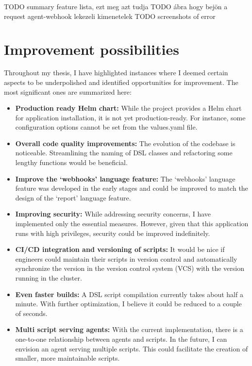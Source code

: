 TODO summary feature lista, ezt meg azt tudja
TODO ábra hogy bejön a request agent-webhook lekezeli kimenetelek
TODO screenshots of error

\section{Improvement possibilities}

Throughout my thesis, I have highlighted instances where I deemed certain aspects to be underpolished and identified opportunities for improvement. The most significant ones are summarized here:

\begin{itemize}
\item \textbf{Production ready Helm chart:} While the project provides a Helm chart for application installation, it is not yet production-ready. For instance, some configuration options cannot be set from the values.yaml file.

\item \textbf{Overall code quality improvements:} The evolution of the codebase is noticeable. Streamlining the naming of DSL classes and refactoring some lengthy functions would be beneficial.

\item \textbf{Improve the `webhooks' language feature:} The `webhooks' language feature was developed in the early stages and could be improved to match the design of the `report' language feature.

\item \textbf{Improving security:} While addressing security concerns, I have implemented only the essential measures. However, given that this application runs with high privileges, security could be improved indefinitely. 

\item \textbf{CI/CD integration and versioning of scripts:} It would be nice if engineers could maintain their scripts in version control and automatically synchronize the version in the version control system (VCS) with the version running in the cluster.

\item \textbf{Even faster builds:} A DSL script compilation currently takes about half a minute. With further optimization, I believe it could be reduced to a couple of seconds.

\item \textbf{Multi script serving agents:} With the current implementation, there is a one-to-one relationship between agents and scripts. In the future, I can envision an agent serving multiple scripts. This could facilitate the creation of smaller, more maintainable scripts.
\end{itemize}
